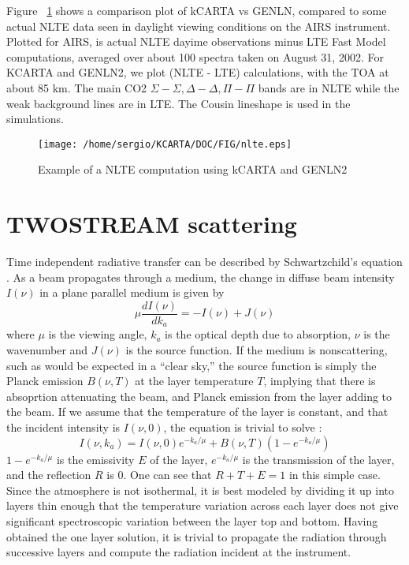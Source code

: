 \documentclass[11pt]{article}
\begin{document}
Figure ~\ref{fig:nlte} shows a comparison plot of kCARTA vs GENLN, compared 
to some actual NLTE data seen in daylight viewing conditions on the AIRS 
instrument. Plotted for AIRS, is actual NLTE dayime observations minus LTE 
Fast Model computations, averaged over about 100 spectra taken on 
August 31, 2002. For KCARTA and GENLN2, we plot (NLTE - LTE) 
calculations, with the TOA at about 85 km. The main CO2 $\Sigma-\Sigma, 
\Delta-\Delta, \Pi-\Pi$ bands are in NLTE while the weak background lines are 
in LTE. The Cousin lineshape is used in the simulations.

\begin{figure}
\texttt{[image: /home/sergio/KCARTA/DOC/FIG/nlte.eps]}
  \caption{Example of a NLTE computation using kCARTA and GENLN2}
  \label{fig:nlte} 
\end{figure} 

\section{TWOSTREAM scattering}

Time independent radiative transfer can be described by Schwartzchild's 
equation \cite{lio:80,goo:89}. As a beam propagates through a medium, the 
change in diffuse beam intensity $I(\nu)$ in a plane parallel medium is 
given by 
\[
\mu \frac{dI(\nu)}{dk_{a}} = -I(\nu) + J(\nu)
\]
where $\mu$ is the viewing angle, $k_{a}$ is the optical depth due to 
absorption, $\nu$ is the wavenumber and $J(\nu)$ is the source function. If 
the medium is nonscattering, such as would be expected in a ``clear sky,'' 
the source function is simply the Planck emission $B(\nu,T)$ at the
layer temperature $T$, implying that there is absoprtion attenuating the beam,
and  Planck emission from the layer adding to the beam. If we assume that the
temperature of the layer is constant, and that the incident intensity is 
$I(\nu,0)$, the equation is trivial to solve : 
\[
I(\nu,k_{a}) = I(\nu,0) e^{-k_{a}/\mu} + B(\nu,T)(1 - e^{-k_{a}/\mu})
\]
$1-e^{-k_{a}/\mu}$ is the emissivity $E$ of the layer, $e^{-k_{a}/\mu}$ is 
the transmission of the layer, and the reflection $R$ is 0. One can see that 
$R+T+E = 1$ in this simple case. Since the atmosphere is not isothermal, it 
is best modeled by dividing it up into layers thin enough that the 
temperature variation across each layer does not give significant 
spectroscopic variation between the layer top and bottom. Having obtained 
the one layer solution, it is trivial to propagate the radiation through 
successive layers and compute the radiation incident at the instrument. 
\end{document}
